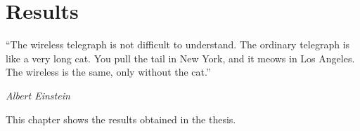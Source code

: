 \chapter{Results}
\label{c:results}

\epigraph{``The wireless telegraph is not difficult to understand. The ordinary telegraph is like a very long cat. You pull the tail in New York, and it meows in Los Angeles. The wireless is the same, only without the cat.''}{\emph{Albert Einstein}}

This chapter shows the results obtained in the thesis.
